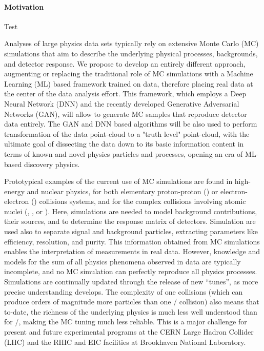 \paragraph{Motivation}

Test

Analyses of large physics data sets typically rely on extensive Monte Carlo (MC) simulations that aim to describe the underlying physical processes, backgrounds, and detector response. We propose to develop an entirely different  approach, augmenting or replacing the traditional role of MC simulations with a Machine Learning (ML) based framework trained on data, therefore placing real data at the center of the data analysis effort. This framework, which employs a Deep Neural Network (DNN) and the recently developed Generative Adversarial Networks (GAN), will allow to generate MC samples that reproduce detector data entirely. The GAN and DNN based algorithms will be also used to perform transformation of the data point-cloud to a "truth level" point-cloud, with the ultimate goal of dissecting the data down to its basic information content in terms of known and novel physics particles and processes, opening an era of ML-based discovery physics.

Prototypical examples of the current use of MC simulations are found in high-energy and nuclear physics, for both elementary proton-proton (\pp) or electron-electron (\eecol) collisions systems, and for the complex collisions involving atomic nuclei (\eA, \pA, or \aacol). Here, simulations are needed to model background contributions, their sources, and to determine the response matrix of detectors. Simulation are used also to separate signal and background particles, extracting parameters like efficiency, resolution, and purity. This information obtained from MC simulations enables the interpretation of  measurements in real data. However, knowledge and models for the sum of all physics phenomena observed in data are typically incomplete, and no MC simulation can perfectly reproduce all physics processes. Simulations are continually updated through the release of new ``tunes'', as more precise understanding develops. The complexity of one {\aacol} collisions (which can produce orders of magnitude more particles than one \eecol/{\pp} collision) also means that to-date, the richness of the underlying physics is much less well understood than for \eecol/{\pp}, making the MC tuning much less reliable. This is a major challenge for present and future experimental programs at the CERN Large Hadron Collider (LHC) and the RHIC and EIC facilities at Brookhaven National Laboratory.

